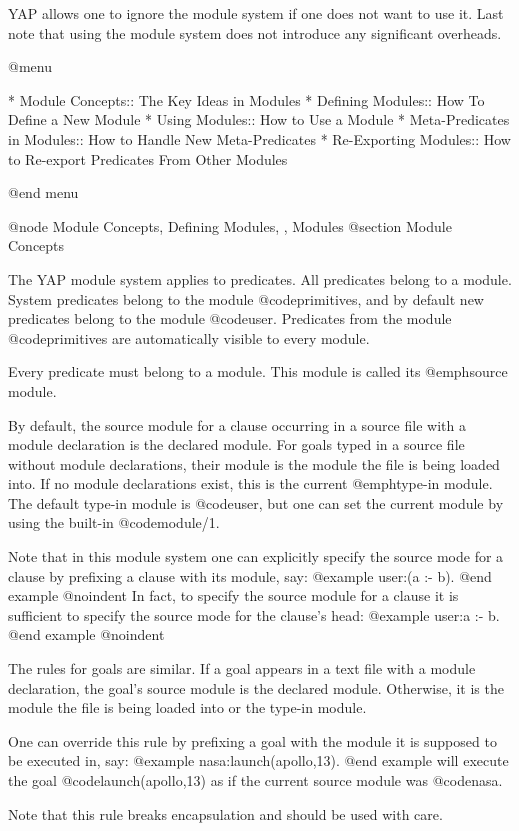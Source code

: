 {{{{YAP allows one to ignore the module system if one does not want to use
it. Last note that using the module system does not introduce any
significant overheads.

@menu

* Module Concepts:: The Key Ideas in Modules
* Defining Modules:: How To Define a New Module
* Using Modules:: How to Use a Module
* Meta-Predicates in Modules:: How to Handle New Meta-Predicates
* Re-Exporting Modules:: How to Re-export Predicates From Other Modules

@end menu

@node Module Concepts, Defining Modules, , Modules
@section Module Concepts

The YAP module system applies to predicates. All predicates belong to a
module. System predicates belong to the module @code{primitives}, and by
default new predicates belong to the module @code{user}. Predicates from
the module @code{primitives} are automatically visible to every module.

Every predicate must belong to a module. This module is called its
@emph{source module}.

By default, the source module for a clause occurring in a source file
with a module declaration is the declared module. For goals typed in 
a source file without module declarations, their module is the module
the file is being loaded into. If no module declarations exist, this is
the current @emph{type-in module}. The default type-in module is
@code{user}, but one can set the current module by using the built-in
@code{module/1}.

Note that in this module system one can explicitly specify the source
mode for a clause by prefixing a clause with its module, say:
@example
user:(a :- b).
@end example
@noindent
In fact, to specify the source module for a clause it is sufficient to
specify the source mode for the clause's head:
@example
user:a :- b.
@end example
@noindent

The rules for goals are similar. If a goal appears in a text file with a
module declaration, the goal's source module is the declared
module. Otherwise, it is the module the file is being loaded into or the
type-in module.

One can override this rule by prefixing a goal with the module it is
supposed to be executed in, say:
@example
nasa:launch(apollo,13).
@end example
will execute the goal @code{launch(apollo,13)} as if the current source
module was @code{nasa}.

Note that this rule breaks encapsulation and should be used with care.

}}}}
